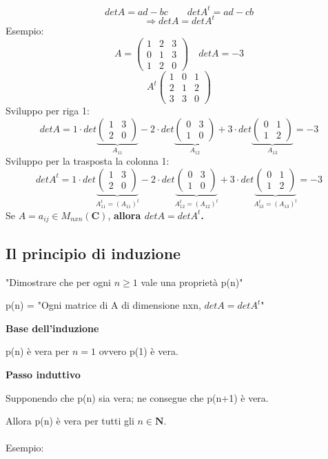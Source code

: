 \documentclass[12pt]{article}
\begin{document}
\[det A = ad-bc \quad \quad det A^t = ad-cb\]
\[\Longrightarrow detA = detA^t\]
Esempio:
\[A = \begin{pmatrix}
    1 & 2 & 3\\
    0 & 1 & 3\\
    1 & 2 & 0
\end{pmatrix} \quad detA = -3\]
\[A^t \begin{pmatrix}
    1 & 0 & 1\\
    2 & 1 & 2\\
    3 & 3 & 0
\end{pmatrix}\]
Sviluppo per riga 1:
\[det A = 1 \cdot det \underbrace{\begin{pmatrix}
    1 & 3\\
    2 & 0
\end{pmatrix}}_{A_{11}} -2 \cdot det \underbrace{\begin{pmatrix}
    0 & 3\\
    1 & 0
\end{pmatrix}}_{A_{12}} + 3 \cdot det \underbrace{\begin{pmatrix}
    0 & 1\\
    1 & 2
\end{pmatrix}}_{A_{13}} = -3\]
Sviluppo per la trasposta la colonna 1:
\[det A^t = 1 \cdot det \underbrace{\begin{pmatrix}
    1 & 3\\
    2 & 0
\end{pmatrix}}_{A^t_{11} = (A_{11})^t} -2 \cdot det \underbrace{\begin{pmatrix}
    0 & 3\\
    1 & 0
\end{pmatrix}}_{A^t_{12} = (A_{12})^t} + 3 \cdot det \underbrace{\begin{pmatrix}
    0 & 1\\
    1 & 2
\end{pmatrix}}_{A^t_{13} = (A_{13})^t} = -3\]
Se $A = a_{ij} \in M_{nxn} (\mathbf{C})$, \textbf{allora $detA = detA^t$.}
\subsection{Il principio di induzione}

"Dimostrare che per ogni $n \ge 1$ vale una proprietà p(n)"
\begin{center}
  p(n) = "Ogni matrice di A di dimensione nxn, $detA = detA^t$"
\end{center}
\textbf{Base dell'induzione}
\begin{center}
    p(n) è vera per $n = 1$ ovvero p(1) è vera.
\end{center}
\textbf{Passo induttivo}
\begin{center}
    Supponendo che p(n) sia vera; ne consegue che p(n+1) è vera.
\end{center}
Allora p(n) è vera per tutti gli $n \in \mathbf{N}$.
\\\\
Esempio:
\end{document}
